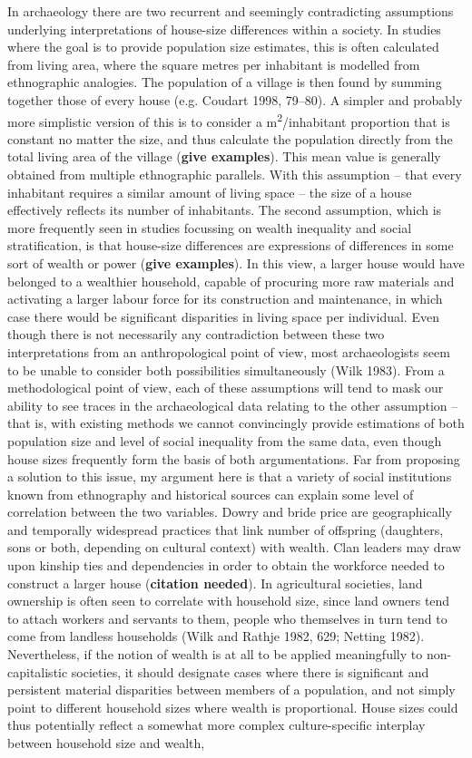 \documentclass[
  12pt,
  a4paper, twoside]{book}
\begin{document}
In archaeology there are two recurrent and seemingly contradicting assumptions underlying interpretations of house-size differences within a society. In studies where the goal is to provide population size estimates, this is often calculated from living area, where the square metres per inhabitant is modelled from ethnographic analogies. The population of a village is then found by summing together those of every house (e.g. Coudart 1998, 79--80). A simpler and probably more simplistic version of this is to consider a m\textsuperscript{2}/inhabitant proportion that is constant no matter the size, and thus calculate the population directly from the total living area of the village (\textbf{give examples}). This mean value is generally obtained from multiple ethnographic parallels. With this assumption -- that every inhabitant requires a similar amount of living space -- the size of a house effectively reflects its number of inhabitants. The second assumption, which is more frequently seen in studies focussing on wealth inequality and social stratification, is that house-size differences are expressions of differences in some sort of wealth or power (\textbf{give examples}). In this view, a larger house would have belonged to a wealthier household, capable of procuring more raw materials and activating a larger labour force for its construction and maintenance, in which case there would be significant disparities in living space per individual. Even though there is not necessarily any contradiction between these two interpretations from an anthropological point of view, most archaeologists seem to be unable to consider both possibilities simultaneously (Wilk 1983). From a methodological point of view, each of these assumptions will tend to mask our ability to see traces in the archaeological data relating to the other assumption -- that is, with existing methods we cannot convincingly provide estimations of both population size and level of social inequality from the same data, even though house sizes frequently form the basis of both argumentations. Far from proposing a solution to this issue, my argument here is that a variety of social institutions known from ethnography and historical sources can explain some level of correlation between the two variables. Dowry and bride price are geographically and temporally widespread practices that link number of offspring (daughters, sons or both, depending on cultural context) with wealth. Clan leaders may draw upon kinship ties and dependencies in order to obtain the workforce needed to construct a larger house (\textbf{citation needed}). In agricultural societies, land ownership is often seen to correlate with household size, since land owners tend to attach workers and servants to them, people who themselves in turn tend to come from landless households (Wilk and Rathje 1982, 629; Netting 1982). Nevertheless, if the notion of wealth is at all to be applied meaningfully to non-capitalistic societies, it should designate cases where there is significant and persistent material disparities between members of a population, and not simply point to different household sizes where wealth is proportional. House sizes could thus potentially reflect a somewhat more complex culture-specific interplay between household size and wealth, 
\end{document}
